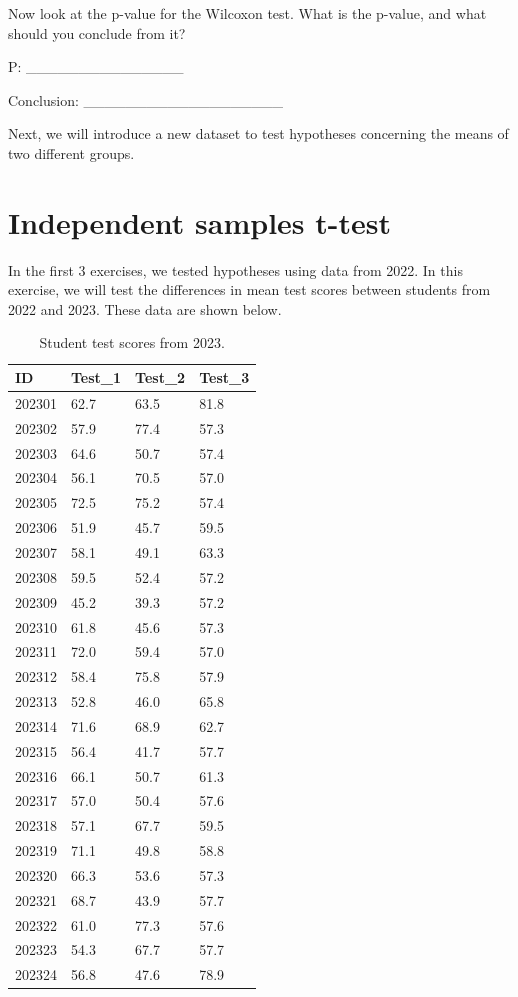 \documentclass[
]{scrbook}
\begin{document}
Now look at the p-value for the Wilcoxon test.
What is the p-value, and what should you conclude from it?

P: \_\_\_\_\_\_\_\_\_\_\_\_\_\_\_

Conclusion: \_\_\_\_\_\_\_\_\_\_\_\_\_\_\_\_\_\_\_

Next, we will introduce a new dataset to test hypotheses concerning the means of two different groups.

\hypertarget{independent-samples-t-test-1}{%
\section{Independent samples t-test}\label{independent-samples-t-test-1}}

In the first 3 exercises, we tested hypotheses using data from 2022.
In this exercise, we will test the differences in mean test scores between students from 2022 and 2023.
These data are shown below.

\begin{table}

\caption{\label{tab:unnamed-chunk-104}Student test scores from 2023.}
\centering
\begin{tabular}[t]{l|l|l|l}
\hline
ID & Test\_1 & Test\_2 & Test\_3\\
\hline
202301 & 62.7 & 63.5 & 81.8\\
\hline
202302 & 57.9 & 77.4 & 57.3\\
\hline
202303 & 64.6 & 50.7 & 57.4\\
\hline
202304 & 56.1 & 70.5 & 57.0\\
\hline
202305 & 72.5 & 75.2 & 57.4\\
\hline
202306 & 51.9 & 45.7 & 59.5\\
\hline
202307 & 58.1 & 49.1 & 63.3\\
\hline
202308 & 59.5 & 52.4 & 57.2\\
\hline
202309 & 45.2 & 39.3 & 57.2\\
\hline
202310 & 61.8 & 45.6 & 57.3\\
\hline
202311 & 72.0 & 59.4 & 57.0\\
\hline
202312 & 58.4 & 75.8 & 57.9\\
\hline
202313 & 52.8 & 46.0 & 65.8\\
\hline
202314 & 71.6 & 68.9 & 62.7\\
\hline
202315 & 56.4 & 41.7 & 57.7\\
\hline
202316 & 66.1 & 50.7 & 61.3\\
\hline
202317 & 57.0 & 50.4 & 57.6\\
\hline
202318 & 57.1 & 67.7 & 59.5\\
\hline
202319 & 71.1 & 49.8 & 58.8\\
\hline
202320 & 66.3 & 53.6 & 57.3\\
\hline
202321 & 68.7 & 43.9 & 57.7\\
\hline
202322 & 61.0 & 77.3 & 57.6\\
\hline
202323 & 54.3 & 67.7 & 57.7\\
\hline
202324 & 56.8 & 47.6 & 78.9\\
\hline
\end{tabular}
\end{table}
\end{document}
